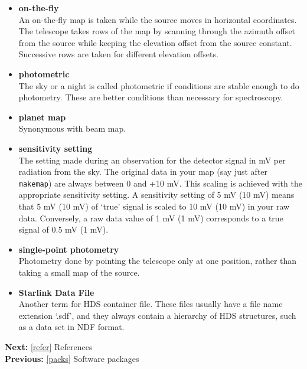 \begin{itemize}
\item{\bf \label{glossonthefly}on-the-fly}\\
   An on-the-fly map is taken while
   the source moves in horizontal coordinates. The telescope takes rows
   of the map by scanning through the azimuth offset from the source
   while keeping the elevation offset from the source constant.
   Successive rows are taken for different elevation offsets.

\item{\bf \label{glossphotometric}photometric}\\
   The sky or a night is called
   photometric if conditions are stable enough to do photometry. These
   are better conditions than necessary for spectroscopy.

\item{\bf \label{glossplanetmap}planet map}\\
   Synonymous with beam map.

\item{\bf \label{glosssensset}sensitivity setting}\\
   The setting made during
   an observation for the detector signal in mV per radiation from the
   sky. The original data in your map (say just after {\tt makemap}) are
   always between 0 and +10 mV. This scaling is achieved with the
   appropriate sensitivity setting. A sensitivity setting of 5 mV (10
   mV) means that 5 mV (10 mV) of `true' signal is scaled to 10 mV (10
   mV) in your raw data. Conversely, a raw data value of 1 mV (1 mV)
   corresponds to a true signal of 0.5 mV (1 mV).

\item{\bf \label{glosssinglepoint}single-point photometry}\\
   Photometry done
   by pointing the telescope only at one position, rather than taking a
   small map of the source.

\item{\bf \label{glosssdf}Starlink Data File}\\
   Another term for HDS container
   file. These files usually have a file name extension `.sdf', and they
   always contain a hierarchy of HDS structures, such as a data set in
   NDF format.

\end{itemize}

\begin{latexonly}
{\bf Next:} \ref{refer} References\\
{\bf Previous:} \ref{packs} Software packages\\
\end{latexonly}

